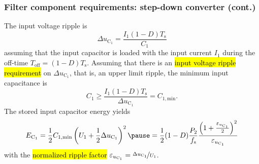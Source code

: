 
\begin{frame}
    \frametitle{Filter component requirements: step-down converter (cont.)}
    The input voltage ripple is
    \begin{equation}
        \Delta u_\mathrm{C_1} = \frac{I_1(1-D)T_\mathrm{s}}{C_1}
    \end{equation}
    assuming that the input capacitor is loaded with the input current $I_1$ during the off-time $T_\mathrm{off}=(1-D)T_\mathrm{s}$. \pause Assuming that there is an \hl{input voltage ripple requirement} on $\Delta u_\mathrm{C_1}$, that is, an upper limit ripple, the minimum input capacitance is 
    \begin{equation}
        C_1 \geq \frac{I_1(1-D)T_\mathrm{s}}{\Delta u_\mathrm{C_1}}=C_{1,\mathrm{min}}.
    \end{equation}\pause
    The stored input capacitor energy yields
    \begin{equation}
        E_\mathrm{C_1} = \frac{1}{2} C_{1,\mathrm{min}} \left(U_1 + \frac{1}{2}\Delta u_\mathrm{C_1}\right)^2 \pause = \frac{1}{2} (1-D)\frac{P_2}{f_\mathrm{s}}\frac{\left(1+\frac{\varepsilon_{u_\mathrm{C_1}}}{2}\right)^2}{\varepsilon_{u_\mathrm{C_1}}}
    \end{equation}
    with the \hl{normalized ripple factor} $\varepsilon_{u_\mathrm{C_1}} = \nicefrac{\Delta u_\mathrm{C_1}}{U_1}$.
\end{frame}


